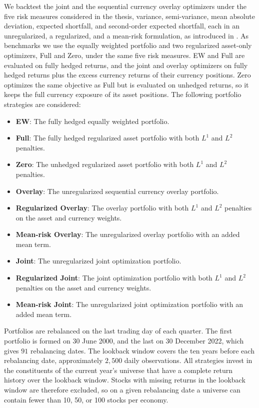 We backtest the joint and the sequential currency overlay optimizers under the five risk measures
considered in the thesis, variance, semi-variance, mean absolute deviation, expected shortfall, and second-order expected
shortfall, each in an unregularized, a regularized, and a mean-risk formulation, as introduced in
. As benchmarks we use the equally weighted portfolio and two regularized
asset-only optimizers, Full and Zero, under the same five risk measures. EW and Full are evaluated on fully hedged
returns, and the joint and overlay optimizers on fully hedged returns plus the excess currency returns of their currency
positions. Zero optimizes the same objective as Full but is evaluated on unhedged returns, so it keeps the full currency
exposure of its asset positions. The following portfolio strategies are considered:
\begin{itemize}
  \item \textbf{EW}: The fully hedged equally weighted portfolio.
  \item \textbf{Full}: The fully hedged regularized asset portfolio with both $L^1$ and $L^2$ penalties.
  \item \textbf{Zero}: The unhedged regularized asset portfolio with both $L^1$ and $L^2$ penalties.
  \item \textbf{Overlay}: The unregularized sequential currency overlay portfolio.
  \item \textbf{Regularized Overlay}: The overlay portfolio with both $L^1$ and $L^2$ penalties on the asset and currency
  weights.
  \item \textbf{Mean-risk Overlay}: The unregularized overlay portfolio with an added mean term.
  \item \textbf{Joint}: The unregularized joint optimization portfolio.
  \item \textbf{Regularized Joint}: The joint optimization portfolio with both $L^1$ and $L^2$ penalties on the asset and
  currency weights.
  \item \textbf{Mean-risk Joint}: The unregularized joint optimization portfolio with an added mean term.
\end{itemize}


Portfolios are rebalanced on the last
trading day of each quarter. The first portfolio is formed
on 30 June 2000, and the last on 30 December 2022, which gives $91$
rebalancing dates. The lookback window covers the ten years
before each rebalancing date, approximately $2{,}500$ daily observations. All strategies invest in the constituents of the current year's universe that have a
complete return history over the lookback window. Stocks with missing returns in the lookback window are therefore
excluded, so on a given rebalancing date a universe can contain fewer than 10, 50, or 100 stocks per economy.

